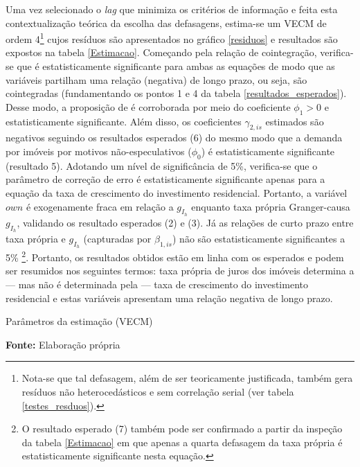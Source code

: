 Uma vez selecionado o \textit{lag} que minimiza os critérios de informação e feita esta contextualização teórica da escolha das defasagens,  estima-se um VECM de ordem 4\footnote{Nota-se que tal defasagem, além de ser teoricamente justificada, também gera resíduos não heterocedásticos e sem correlação serial (ver tabela \ref{testes_resduos}).} cujos resíduos são apresentados no gráfico \ref{residuos} e resultados são expostos na tabela \ref{Estimacao}.
Começando pela relação de cointegração, verifica-se que é estatisticamente significante para ambas as equações de modo que as variáveis partilham uma relação (negativa) de longo prazo, ou seja, são cointegradas (fundamentando os pontos 1 e 4 da tabela \ref{resultados_esperados}).
Desse modo, a proposição de \textcite{teixeira_crescimento_2015} é corroborada por meio do coeficiente $\phi_1> 0$ e estatisticamente significante.
Além disso, os coeficientes $\gamma_{2,is}$ estimados são negativos seguindo os resultados esperados (6) do mesmo modo que a demanda por imóveis por motivos não-especulativos ($\phi_0$) é estatisticamente significante (resultado 5).
Adotando um nível de significância de 5\%, verifica-se que o parâmetro de correção de erro é estatisticamente significante apenas para a equação da taxa de crescimento do investimento residencial. Portanto, a variável $own$ é exogenamente fraca em relação a $g_{I_h}$ enquanto taxa própria Granger-causa $g_{I_h}$, validando os resultado esperados (2) e (3).
Já as relações de curto prazo entre taxa própria e $g_{I_h}$ (capturadas por $\beta_{1,is}$) não são estatisticamente significantes a 5\% \footnote{O resultado esperado (7) também pode ser confirmado a partir da inspeção da tabela \ref{Estimacao} em que apenas a quarta defasagem da taxa própria é estatisticamente significante nesta equação.}. Portanto, os resultados obtidos estão em linha com os esperados e podem ser resumidos nos seguintes termos: taxa própria de juros dos imóveis determina a --- mas não é determinada pela --- taxa de crescimento do investimento residencial e estas variáveis apresentam uma relação negativa de longo prazo.

\begin{table}[H]
	\centering
	\caption{Parâmetros da estimação (VECM)}
	
	\caption*{\textbf{Fonte:} Elaboração própria}
\end{table}


